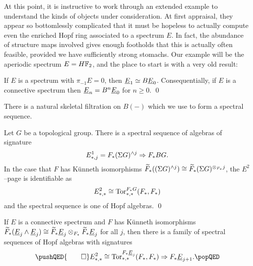 At this point, it is instructive to work through an extended example to understand the kinds of objects under consideration.  At first appraisal, they appear so bottomlessly complicated that it must be hopeless to actually compute even the enriched Hopf ring associated to a spectrum \(E\).  In fact, the abundance of structure maps involved gives enough footholds that this is actually often feasible, provided we have sufficiently strong stomachs.  Our example will be the aperiodic spectrum \(E = \HFtwo\), and the place to start is with a very old result:
\begin{lemma}
If \(E\) is a spectrum with \(\pi_{-1} E = 0\), then \(\underline{\smash{E}}_{1} \simeq B\underline{\smash{E}}_{0}\).  Consequentially, if \(E\) is a connective spectrum then \(\underline{\smash{E}}_{n} = B^n \underline{\smash{E}}_{0}\) for \(n \ge 0\). \qed
\end{lemma}
\noindent There is a natural skeletal filtration on \(B(-)\) which we use to form a spectral sequence.
\begin{lemma}
Let \(G\) be a topological group.  There is a spectral sequence of algebras of signature \[E^1_{*, j} = F_*(\Sigma G)^{\wedge j} \Rightarrow F_* BG.\]  In the case that \(F\) has K\"unneth isomorphisms \(\widetilde F_*((\Sigma G)^{\wedge j}) \cong \widetilde F_*(\Sigma G)^{\otimes_{F_*} j}\), the \(E^2\)--page is identifiable as \[E^2_{*, *} \cong \operatorname{Tor}^{F_* G}_{*, *}(F_*, F_*)\] and the spectral sequence is one of Hopf algebras. \qed
\end{lemma}
\begin{corollary}
If \(E\) is a connective spectrum and \(F\) has K\"unneth isomorphisms \(\widetilde F_*(\underline{\smash{E}}_{j} \wedge \underline{\smash{E}}_{j}) \cong \widetilde F_* \underline{\smash{E}}_{j} \otimes_{F_*} \widetilde F_* \underline{\smash{E}}_{j}\) for all \(j\), then there is a family of spectral sequences of Hopf algebras with signatures
\[
\pushQED{\qed}
E^2_{*, *} \cong \Tor^{F_* \OS{E}{j}}_{*, *}(F_*, F_*) \Rightarrow F_* \OS{E}{j+1}. \qedhere
\popQED
\]
\end{corollary}

